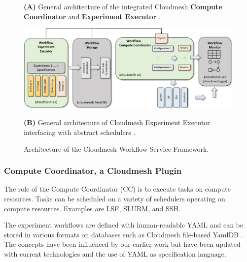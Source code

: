 \documentclass[sigconf]{acmart}
\begin{document}
\begin{figure}[htb]
{    {\bf (A)} General architecture of the integrated Cloudmesh {\bf Compute Coordinator} and {\bf Experiment Executor} \citep{las-frontiers-edu}.

\bigskip\bigskip
    
    \centering\includegraphics[width=1.0\textwidth]{images/cloudmesh-ee-new}
    
    
    {\bf (B)} General architecture of Cloudmesh Experiment Executor interfacing with abstract schedulers \citep{las-frontiers-edu}.
  }

  
  
    \caption{Architecture of the Cloudmesh Workflow Service Framework.}
    \label{fig:cc-2}

\end{figure}


 
\subsubsection{Compute Coordinator, a Cloudmesh Plugin}
\label{sec:workflow-cc}

The role of the Compute Coordinator (CC) is to execute tasks on compute resources. Tasks can be scheduled on a variety of schedulers operating on compute resources. Examples are LSF, SLURM, and SSH.

The experiment workflows are defined with human-readable YAML and can be stored in various formats on databases such as Cloudmesh file-based YamlDB \citep{yamldb}. The concepts have been influenced by our earlier work \cite{las-94-ecwmf} but have been updated with current technologies and the use of YAML as specification language.
\end{document}
